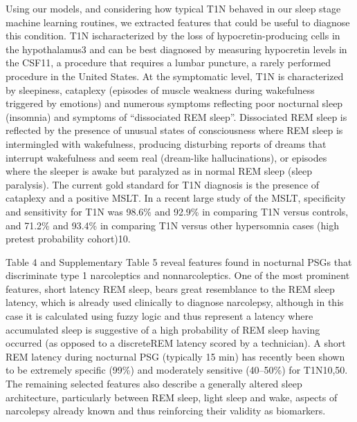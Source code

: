 Using our models, and considering how typical T1N behaved in our sleep stage machine learning routines, we extracted features that could be useful to diagnose this condition.
T1N ischaracterized by the loss of hypocretin-producing cells in the hypothalamus3 and can be best diagnosed by measuring hypocretin levels in the CSF11, a procedure that requires a lumbar puncture, a rarely performed procedure in the United States. 
At the symptomatic level, T1N is characterized by sleepiness, cataplexy (episodes of muscle weakness during wakefulness triggered by emotions) and numerous symptoms reflecting poor nocturnal sleep (insomnia) and symptoms of “dissociated REM sleep”.
Dissociated REM sleep is reflected by the presence of unusual states of consciousness where REM sleep is intermingled with wakefulness, producing disturbing reports of dreams that interrupt wakefulness and seem real (dream-like hallucinations), or episodes where the sleeper is awake but paralyzed as in normal REM sleep (sleep paralysis).
The current gold standard for T1N diagnosis is the presence of cataplexy and a positive MSLT.
In a recent large study of the MSLT, specificity and sensitivity for T1N was 98.6\% and 92.9\% in comparing T1N versus controls, and 71.2\% and 93.4\% in comparing T1N versus other hypersomnia cases (high pretest probability cohort)10.

Table 4 and Supplementary Table 5 reveal features found in nocturnal PSGs that discriminate type 1 narcoleptics and nonnarcoleptics.
One of the most prominent features, short latency REM sleep, bears great resemblance to the REM sleep latency, which is already used clinically to diagnose narcolepsy, although in this case it is calculated using fuzzy logic and thus represent a latency where accumulated sleep is suggestive of a high probability of REM sleep having occurred (as opposed to a discreteREM latency scored by a technician).
A short REM  latency during nocturnal PSG (typically 15 min) has recently been shown to be extremely specific (99\%) and moderately sensitive (40–50\%) for T1N10,50.
The remaining selected features also describe a generally altered sleep architecture, particularly between REM sleep,
light sleep and wake, aspects of narcolepsy already known and
thus reinforcing their validity as biomarkers.

